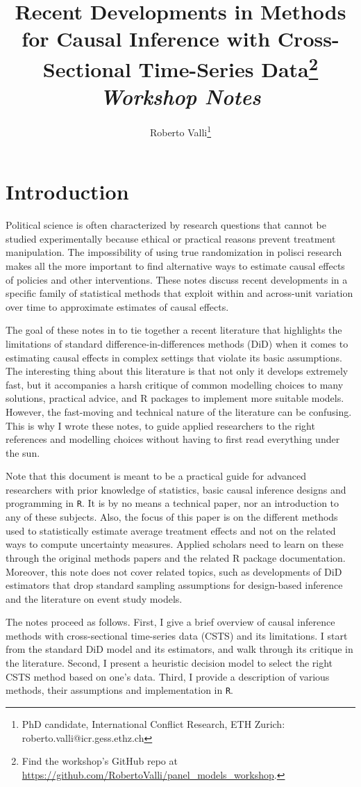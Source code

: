 \documentclass[hidelinks]{article}\usepackage[]{graphicx}\usepackage[]{color}
\author{
	Roberto Valli\thanks{PhD candidate, International Conflict Research, ETH Zurich: roberto.valli@icr.gess.ethz.ch} 
}
\title{
	 Recent Developments in Methods for Causal Inference with Cross-Sectional Time-Series Data\thanks{Find the workshop's GitHub repo at \url{https://github.com/RobertoValli/panel_models_workshop}.}\\[1em]
	 \textit{Workshop Notes}
}
\begin{document}
\maketitle

\section{Introduction}

Political science is often characterized by research questions that cannot be studied experimentally because ethical or practical reasons prevent treatment manipulation. The impossibility of using true randomization in polisci research makes all the more important to find alternative ways to estimate causal effects of policies and other interventions. These notes discuss recent developments in a specific family of statistical methods that exploit within and across-unit variation over time to approximate estimates of causal effects. 

The goal of these notes in to tie together a recent literature that highlights the limitations of standard difference-in-differences methods (DiD) when it comes to estimating causal effects in complex settings that violate its basic assumptions. The interesting thing about this literature is that not only it develops extremely fast, but it accompanies a harsh critique of common modelling choices to many solutions, practical advice, and R packages to implement more suitable models. However, the fast-moving and technical nature of the literature can be confusing. This is why I wrote these notes, to guide applied researchers to the right references and modelling choices without having to first read everything under the sun.

Note that this document is meant to be a practical guide for advanced researchers with prior knowledge of statistics, basic causal inference designs and programming in \texttt{R}. It is by no means a technical paper, nor an introduction to any of these subjects. Also, the focus of this paper is on the different methods used to statistically estimate average treatment effects and not on the related ways to compute uncertainty measures. Applied scholars need to learn on these through the original methods papers and the related R package documentation. Moreover, this note does not cover related topics, such as developments of DiD estimators that drop standard sampling assumptions for design-based inference and the literature on event study models.

The notes proceed as follows. First, I give a brief overview of causal inference methods with cross-sectional time-series data (CSTS) and its limitations. I start from the standard DiD model and its estimators, and walk through its critique in the literature. Second, I present a heuristic decision model to select the right CSTS method based on one's data. Third, I provide a description of various methods, their assumptions and implementation in \texttt{R}.
\end{document}
